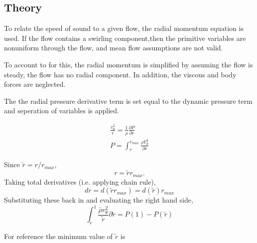 \documentclass[12pt]{article}
\begin{document}
\subsection{Theory}

To relate the speed of sound to a given flow, the radial momentum equation
is used.  If the flow contains a swirling component,then the primitive variables 
are nonuniform through the flow, and mean flow assumptions are not valid. 

 To account to for this, the radial momentum is simplified by assuming the 
 flow is steady, the flow has no radial component. In addition, the viscous
 and body forces are neglected.
 
 The the radial pressure derivative term is set equal to the dynamic pressure term
 and seperation of variables is applied.  

 \begin{align*}
     \frac{v_{\theta}^2}{r} = \frac{1}{\rho}\frac{\partial P}{\partial r} \\
 P = \int_{r}^{r_{max}} \frac{\rho V_{\theta}^2}{ \partial r}
 \end{align*}
 



Since $\tilde{r} = r/r_{max}$,
\[r = \tilde{r}r_{max}.\]
Taking total derivatives (i.e. applying chain rule),
\[dr = d(\tilde{r}r_{max}) = d(\tilde{r})r_{max}\]
Substituting these back in and evaluating the right hand side,
\[
    \int_{\tilde{r}}^{1} \frac{\bar{\rho} v_{\theta}^2}{\tilde{r}}\partial \tilde{r} 
    =P(1)-P(\tilde{r})
\]

For reference the minimum value of $\tilde{r}$ is
\end{document}
